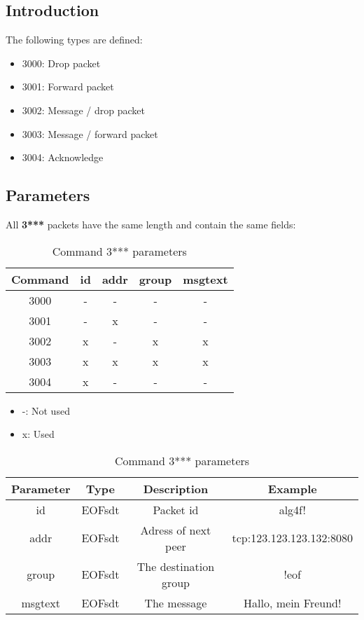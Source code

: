 \documentclass[12pt,a4paper]{book}
\begin{document}
\subsection{Introduction}
The following types are defined:

\begin{itemize}
\item 3000: Drop packet
\item 3001: Forward packet
\item 3002: Message / drop packet
\item 3003: Message / forward packet
\item 3004: Acknowledge
\end{itemize}
\subsection{Parameters}
All \textbf{3***} packets have the same length and contain the same fields:
\begin{longtable}{|c|c|c|c|c|}
\caption{Command 3*** parameters}\\
\hline
\textbf{Command} & \textbf{id} & \textbf{addr} & \textbf{group} & \textbf{msgtext}\\
\hline
3000 & - & - & - & - \\
\hline
3001 & - & x & - & - \\
\hline
3002 & x & - & x & x \\
\hline
3003 & x & x & x & x \\
\hline
3004 & x & - & - & -\\
\hline
\end{longtable}

\begin{itemize}
\item -: Not used
\item x: Used
\end{itemize}

\begin{longtable}{|c|c|c|c|}
\caption{Command 3*** parameters}\\
\hline
\textbf{Parameter} & \textbf{Type} & \textbf{Description} & \textbf{Example}\\
\hline
id & EOFsdt & Packet id & alg4f!\\
\hline
addr & EOFsdt & Adress of next peer & tcp:123.123.123.132:8080\\
\hline
group & EOFsdt & The destination group & !eof\\
\hline
msgtext & EOFsdt & The message & Hallo, mein Freund!\\
\hline
\end{longtable}
\end{document}
